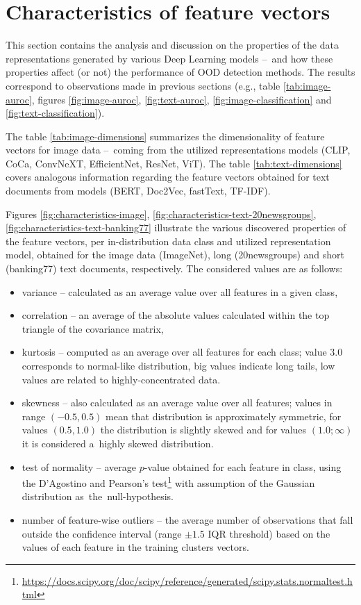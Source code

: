 \section{Characteristics of feature vectors}
\label{section:real-characteristics}

This section contains the analysis and discussion on the properties of the data representations generated by various Deep Learning models –~and how these properties affect (or not) the performance of OOD detection methods. The results correspond to observations made in previous sections (e.g., table \ref{tab:image-auroc}, figures \ref{fig:image-auroc}, \ref{fig:text-auroc}, \ref{fig:image-classification} and \ref{fig:text-classification}).

The table \ref{tab:image-dimensions} summarizes the dimensionality of feature vectors for image data –~coming from the utilized representations models (CLIP, CoCa, ConvNeXT, EfficientNet, ResNet, ViT). The table \ref{tab:text-dimensions} covers analogous information regarding the feature vectors obtained for text documents from models (BERT, Doc2Vec, fastText, TF-IDF).

Figures \ref{fig:characteristics-image}, \ref{fig:characteristics-text-20newsgroups}, \ref{fig:characteristics-text-banking77} illustrate the various discovered properties of the feature vectors, per in-distribution data class and utilized representation model, obtained for the image data (ImageNet), long (20newsgroups) and short (banking77) text documents, respectively. The considered values are as follows:
\vspace{-0.5\baselineskip}
\begin{itemize}
    \item variance – calculated as an average value over all features in a given class,
    \item correlation – an average of the absolute values calculated within the top triangle of the covariance matrix,
    \item kurtosis – computed as an average over all features for each class; value $3.0$ corresponds to normal-like distribution, big values indicate long tails, low values are related to highly-concentrated data.
    \item skewness – also calculated as an average value over all features; values in range $(-0.5, 0.5)$ mean that distribution is approximately symmetric, for values $(0.5, 1.0)$ the distribution is slightly skewed and for values $(1.0; \infty)$ it is considered a~highly skewed distribution.
    \item test of normality – average $p$-value obtained for each feature in class, using the D’Agostino and Pearson’s test\footnote{\url{https://docs.scipy.org/doc/scipy/reference/generated/scipy.stats.normaltest.html}} with assumption of the Gaussian distribution as~the~null-hypothesis.
    \item number of feature-wise outliers – the average number of observations that fall outside the confidence interval (range $\pm1.5$ IQR threshold) based on the values of each feature in the training clusters vectors.
\end{itemize}

